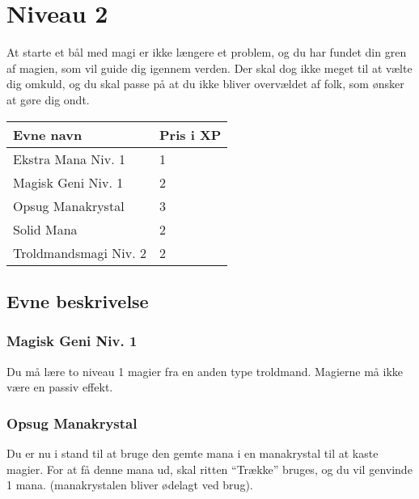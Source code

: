 \chapter{Niveau 2}
At starte et bål med magi er ikke længere et problem, og du har fundet din gren af magien, som vil guide dig igennem verden. Der skal dog ikke meget til at vælte dig omkuld, og du skal passe på at du ikke bliver overvældet af folk, som ønsker at gøre dig ondt.

\begin{table}[H]
    \centering
    \begin{tabular}{|p{}|p{}|}
    \rowcolor{cerulean!80}\hline
    Evne navn & Pris i XP \\\hline
        Ekstra Mana Niv. 1 & 1 \\\hline
        Magisk Geni Niv. 1 & 2 \\\hline
        Opsug Manakrystal & 3\\\hline
        Solid Mana & 2 \\\hline
        Troldmandsmagi Niv. 2 & 2\\\hline
    \end{tabular}
\end{table}
\section{Evne beskrivelse}



\subsection{Magisk Geni Niv. 1}
Du må lære to niveau 1 magier fra en anden type troldmand. Magierne må ikke være en passiv effekt.


\subsection{Opsug Manakrystal}
Du er nu i stand til at bruge den gemte mana i en manakrystal til at kaste magier. For at få denne mana ud, skal ritten “Trække” bruges, og du vil genvinde 1 mana. (manakrystalen bliver ødelagt ved brug).

